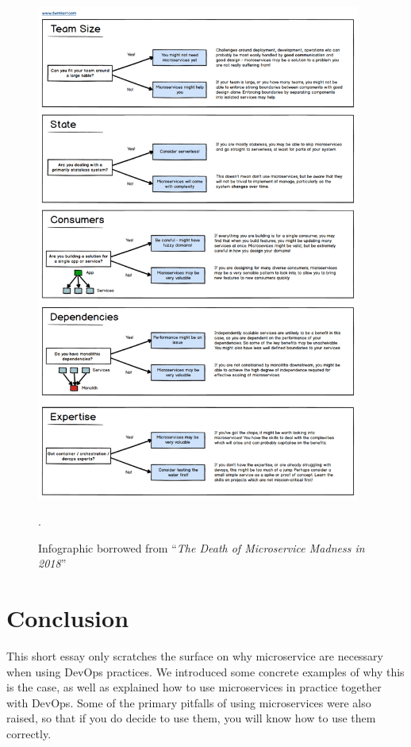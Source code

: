 \documentclass[a4paper]{article}
\begin{document}
\begin{figure}
    \centering
    \includegraphics[width=0.95\textwidth]{microservice-questions.png}
    \caption{Infographic borrowed from ``\textit{The Death of Microservice Madness in 2018}'' \cite{Kerr}}.
    \label{fig:questions}
\end{figure}

\section{Conclusion}
This short essay only scratches the surface on why microservice are necessary when using DevOps practices. We introduced some concrete examples of why this is the case, as well as explained how to use microservices in practice together with DevOps. Some of the primary pitfalls of using microservices were also raised, so that if you do decide to use them, you will know how to use them correctly.
\end{document}
